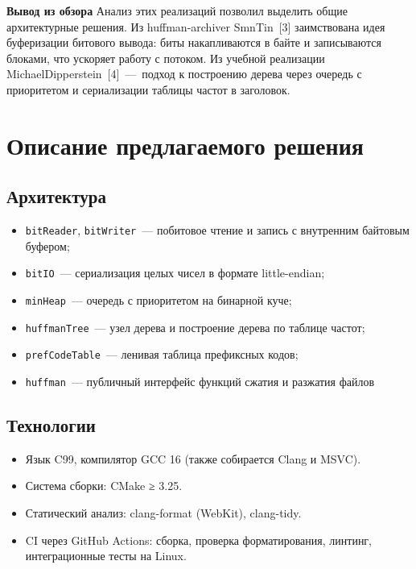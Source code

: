 \documentclass[a4paper]{article}
\begin{document}
\textbf{Вывод из обзора}
Анализ этих реализаций позволил
выделить общие архитектурные решения. Из huffman-archiver SmnTin~[3]
заимствована идея буферизации битового вывода: биты накапливаются в байте
и записываются блоками, что ускоряет работу с потоком. Из учебной
реализации MichaelDipperstein~[4]~---~подход к построению дерева через
очередь с приоритетом и сериализации таблицы частот в заголовок.

\section{Описание предлагаемого решения}

\subsection{Архитектура}

\begin{itemize}
    \item \texttt{bitReader}, \texttt{bitWriter}~--- побитовое чтение
    и запись с внутренним байтовым буфером;
    \item \texttt{bitIO}~--- сериализация целых чисел
    в формате little-endian;
    \item \texttt{minHeap}~--- очередь с приоритетом на бинарной куче;
    \item \texttt{huffmanTree}~--- узел дерева и построение дерева
    по таблице частот;
    \item \texttt{prefCodeTable}~--- ленивая таблица префиксных кодов;
    \item \texttt{huffman}~--- публичный интерфейс функций сжатия и разжатия файлов
\end{itemize}

\subsection{Технологии}

\begin{itemize}
    \item Язык C99, компилятор GCC 16 (также собирается Clang и MSVC).
    \item Система сборки: CMake ≥ 3.25.
    \item Статический анализ: clang-format (WebKit), clang-tidy.
    \item CI через GitHub Actions: сборка, проверка форматирования, линтинг, интеграционные тесты на Linux.
\end{itemize}
\end{document}
